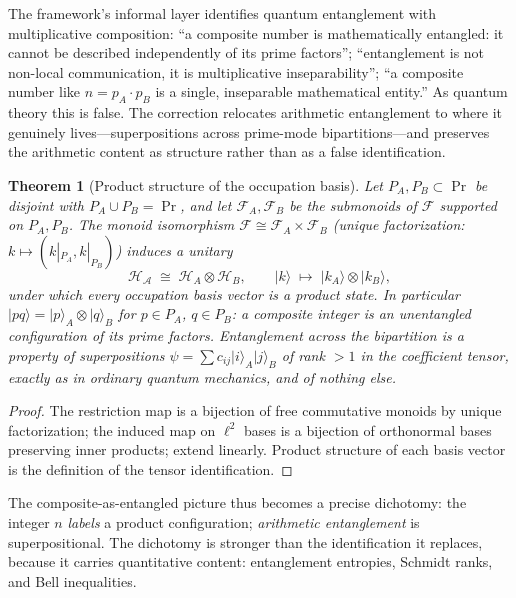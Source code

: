 \documentclass[11pt,a4paper]{article}
\theoremstyle{plain}
\newtheorem{theorem}{Theorem}[section]
\theoremstyle{definition}
\theoremstyle{remark}
\newcommand{\ket}[1]{\lvert #1\rangle}
\newcommand{\Hil}{\mathcal{H}}
\begin{document}
The framework's informal layer identifies quantum entanglement with multiplicative
composition: ``a composite number is mathematically entangled: it cannot be described
independently of its prime factors''; ``entanglement is not non-local communication, it is
multiplicative inseparability''; ``a composite number like $n=p_{A}\cdot p_{B}$ is a single,
inseparable mathematical entity.'' As quantum theory this is false. The correction
relocates arithmetic entanglement to where it genuinely lives---superpositions across
prime-mode bipartitions---and preserves the arithmetic content as structure rather than as
a false identification.

\begin{theorem}[Product structure of the occupation basis]\label{prop:productstructure}
Let $P_{A},P_{B}\subset\Pr$ be disjoint with $P_{A}\cup P_{B}=\Pr$, and let
$\mathcal{F}_{A},\mathcal{F}_{B}$ be the submonoids of $\mathcal{F}$ supported on
$P_{A},P_{B}$. The monoid isomorphism $\mathcal{F}\cong\mathcal{F}_{A}\times\mathcal{F}_{B}$
(unique factorization: $k\mapsto(k|_{P_{A}},k|_{P_{B}})$) induces a unitary
\begin{equation}
\Hil_{\mathcal{A}}\;\cong\;\Hil_{A}\otimes\Hil_{B},
\qquad
\ket{k}\;\mapsto\;\ket{k_{A}}\otimes\ket{k_{B}},
\end{equation}
under which every occupation basis vector is a \emph{product state}. In particular
$\ket{pq}=\ket{p}_{A}\otimes\ket{q}_{B}$ for $p\in P_{A}$, $q\in P_{B}$: a composite integer
is an \emph{unentangled} configuration of its prime factors. Entanglement across the
bipartition is a property of \emph{superpositions}
$\psi=\sum c_{ij}\ket{i}_{A}\ket{j}_{B}$ of rank $>1$ in the coefficient tensor, exactly as
in ordinary quantum mechanics, and of nothing else.
\end{theorem}

\begin{proof}
The restriction map is a bijection of free commutative monoids by unique factorization; the
induced map on $\ell^{2}$ bases is a bijection of orthonormal bases preserving inner
products; extend linearly. Product structure of each basis vector is the definition of the
tensor identification.
\end{proof}

The composite-as-entangled picture thus becomes a precise dichotomy: the
integer $n$ \emph{labels} a product configuration; \emph{arithmetic entanglement} is
superpositional. The dichotomy is stronger than the identification it replaces, because it
carries
quantitative content: entanglement entropies, Schmidt ranks, and Bell
inequalities.
\end{document}
